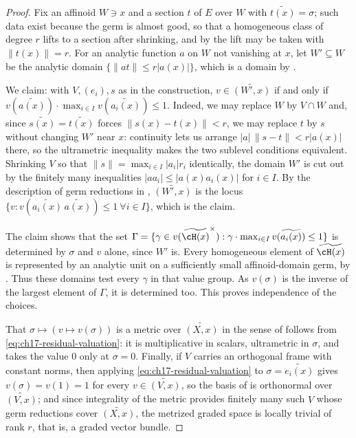 \begin{proof}
Fix an affinoid $W\ni x$ and a section $t$ of $E$ over $W$ with
$\widetilde{t(x)}=\sigma$; such data exist because the germ is almost
good, so that a homogeneous class of degree $r$ lifts to a section after
shrinking, and by  the lift may be taken
with $\|t(x)\|=r$.  For an analytic function $a$ on $W$ not vanishing
at $x$, let $W'\subseteq W$ be the analytic domain
$\{\|at\|\le r|a(x)|\}$, which is a domain by
.

We claim: with $V,(e_i),s$ as in the construction, $v\in\widetilde{(W',x)}$
if and only if $v(\widetilde{a(x)})\cdot\max_{i\in I}v(\widetilde{a_i(x)})\le1$.
Indeed, we may replace $W$ by $V\cap W$ and, since
$\widetilde{s(x)}=\widetilde{t(x)}$ forces $\|s(x)-t(x)\|<r$, we may
replace $t$ by $s$ without changing $W'$ near $x$:
continuity lets us arrange $|a|\,\|s-t\|<r|a(x)|$ there, so the
ultrametric inequality makes the two sublevel conditions equivalent.
Shrinking $V$
so that $\|s\|=\max_{i\in I}|a_i|r_i$ identically, the domain $W'$ is
cut out by the finitely many inequalities $|aa_i|\le|a(x)a_i(x)|$ for
$i\in I$.  By the description of germ reductions in
, $\widetilde{(W',x)}$ is the locus
$\{v:v(\widetilde{a_i(x)}\,\widetilde{a(x)})\le1\ \forall i\in I\}$, which
is the claim.

The claim shows that the set
$\Gamma=\{\gamma\in v(\widetilde{\cH(x)}^\times):
 \gamma\cdot\max_{i\in I}v(\widetilde{a_i(x)})\le1\}$
is determined by $\sigma$ and $v$ alone, since $W'$ is.
Every homogeneous element of $\widetilde{\cH(x)}$ is represented
by an analytic unit on a sufficiently small affinoid-domain germ,
by \cite[Lemma~17.3.2 and Proposition~17.3.3]{CLD25}.
Thus these domains test every $\gamma$ in that value group.  As
$v(\sigma)$ is the inverse of the largest element of $\Gamma$, it is
determined too.  This proves independence of the choices.

That $\sigma\mapsto(v\mapsto v(\sigma))$ is a metric over
$\widetilde{(X,x)}$ in the sense of 
follows from \eqref{eq:ch17-residual-valuation}: it is multiplicative in
scalars, ultrametric in $\sigma$, and takes the value $0$ only at
$\sigma=0$.  Finally, if $V$ carries an orthogonal frame with constant
norms, then applying \eqref{eq:ch17-residual-valuation} to
$\sigma=\widetilde{e_i(x)}$ gives $v(\sigma)=v(1)=1$ for every
$v\in\widetilde{(V,x)}$, so the basis of
 is orthonormal over $\widetilde{(V,x)}$;
and since integrality of the metric provides finitely many such $V$ whose
germ reductions cover $\widetilde{(X,x)}$, the metrized graded space is
locally trivial of rank $r$, that is, a graded vector bundle.
\end{proof}


